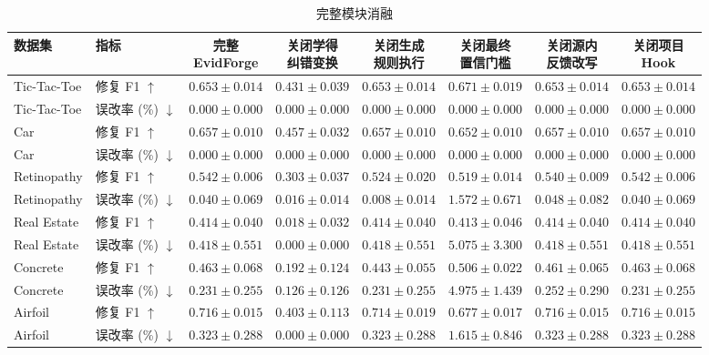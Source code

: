 \begin{table}[b]
\centering
\caption{完整模块消融}
\label{tab:oct23_ablation_all}
\fontsize{7.5}{9}\selectfont
\setlength{\tabcolsep}{3pt}
\renewcommand{\arraystretch}{1.10}
\begin{tabular*}{\textwidth}{@{\extracolsep{\fill}}llcccccc@{}}
\toprule
数据集 & 指标 & \makecell{完整\\EvidForge} & \makecell{关闭学得\\纠错变换} & \makecell{关闭生成\\规则执行} & \makecell{关闭最终\\置信门槛} & \makecell{关闭源内\\反馈改写} & \makecell{关闭项目\\Hook} \\
\midrule
Tic-Tac-Toe & 修复 F1 $\uparrow$ & $0.653\pm0.014$ & $0.431\pm0.039$ & $0.653\pm0.014$ & $0.671\pm0.019$ & $0.653\pm0.014$ & $0.653\pm0.014$ \\
Tic-Tac-Toe & 误改率 (\%) $\downarrow$ & $0.000\pm0.000$ & $0.000\pm0.000$ & $0.000\pm0.000$ & $0.000\pm0.000$ & $0.000\pm0.000$ & $0.000\pm0.000$ \\
\addlinespace[2pt]
Car & 修复 F1 $\uparrow$ & $0.657\pm0.010$ & $0.457\pm0.032$ & $0.657\pm0.010$ & $0.652\pm0.010$ & $0.657\pm0.010$ & $0.657\pm0.010$ \\
Car & 误改率 (\%) $\downarrow$ & $0.000\pm0.000$ & $0.000\pm0.000$ & $0.000\pm0.000$ & $0.000\pm0.000$ & $0.000\pm0.000$ & $0.000\pm0.000$ \\
\addlinespace[2pt]
Retinopathy & 修复 F1 $\uparrow$ & $0.542\pm0.006$ & $0.303\pm0.037$ & $0.524\pm0.020$ & $0.519\pm0.014$ & $0.540\pm0.009$ & $0.542\pm0.006$ \\
Retinopathy & 误改率 (\%) $\downarrow$ & $0.040\pm0.069$ & $0.016\pm0.014$ & $0.008\pm0.014$ & $1.572\pm0.671$ & $0.048\pm0.082$ & $0.040\pm0.069$ \\
\addlinespace[2pt]
Real Estate & 修复 F1 $\uparrow$ & $0.414\pm0.040$ & $0.018\pm0.032$ & $0.414\pm0.040$ & $0.413\pm0.046$ & $0.414\pm0.040$ & $0.414\pm0.040$ \\
Real Estate & 误改率 (\%) $\downarrow$ & $0.418\pm0.551$ & $0.000\pm0.000$ & $0.418\pm0.551$ & $5.075\pm3.300$ & $0.418\pm0.551$ & $0.418\pm0.551$ \\
\addlinespace[2pt]
Concrete & 修复 F1 $\uparrow$ & $0.463\pm0.068$ & $0.192\pm0.124$ & $0.443\pm0.055$ & $0.506\pm0.022$ & $0.461\pm0.065$ & $0.463\pm0.068$ \\
Concrete & 误改率 (\%) $\downarrow$ & $0.231\pm0.255$ & $0.126\pm0.126$ & $0.231\pm0.255$ & $4.975\pm1.439$ & $0.252\pm0.290$ & $0.231\pm0.255$ \\
\addlinespace[2pt]
Airfoil & 修复 F1 $\uparrow$ & $0.716\pm0.015$ & $0.403\pm0.113$ & $0.714\pm0.019$ & $0.677\pm0.017$ & $0.716\pm0.015$ & $0.716\pm0.015$ \\
Airfoil & 误改率 (\%) $\downarrow$ & $0.323\pm0.288$ & $0.000\pm0.000$ & $0.323\pm0.288$ & $1.615\pm0.846$ & $0.323\pm0.288$ & $0.323\pm0.288$ \\
\bottomrule
\end{tabular*}
\end{table}
